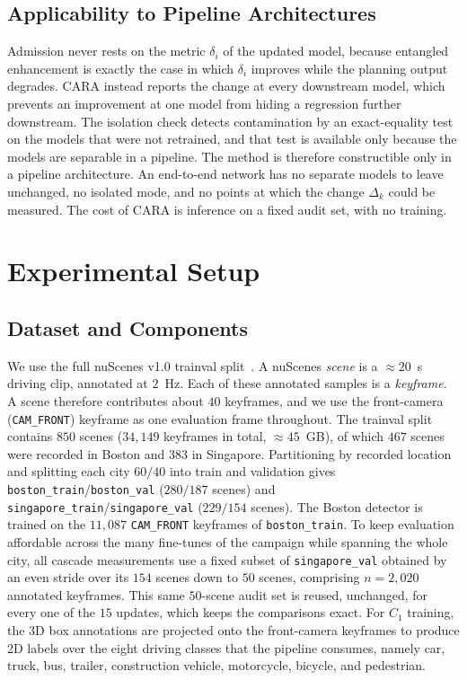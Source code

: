 \documentclass[conference]{IEEEtran}
\begin{document}
\subsection{Applicability to Pipeline Architectures}
Admission never rests on the metric $\delta_i$ of the updated model, because
entangled enhancement is exactly the case in which $\delta_i$ improves while the
planning output degrades. CARA instead reports the change at every downstream
model, which prevents an
improvement at one model from hiding a regression further downstream. The
isolation check detects contamination by an exact-equality test on the models that
were not retrained, and that test is available only because the models are
separable in a pipeline. The method is therefore constructible only in a pipeline
architecture. An end-to-end network has no separate models to leave unchanged, no
isolated mode, and no points at
which the change $\Delta_k$ could be measured. The cost of CARA is
inference on a fixed audit set, with no training.

\section{Experimental Setup}
\label{sec:setup}

\subsection{Dataset and Components}
We use the full nuScenes v1.0 trainval split~\cite{caesar2020nuscenes}. A
nuScenes \emph{scene} is a $\approx 20$~s driving clip, annotated at $2$~Hz. Each
of these annotated samples is a \emph{keyframe}. A scene therefore contributes
about $40$ keyframes, and we use the front-camera (\texttt{CAM\_FRONT}) keyframe
as one evaluation frame throughout. The trainval split contains $850$ scenes
($34{,}149$ keyframes in total, $\approx 45$~GB), of which $467$ scenes were
recorded in Boston and $383$ in Singapore. Partitioning by recorded location and
splitting each city $60/40$ into train and validation gives
\texttt{boston\_train}/\texttt{boston\_val} ($280/187$ scenes) and
\texttt{singapore\_train}/\texttt{singapore\_val} ($229/154$ scenes). The Boston
detector is trained on the $11{,}087$ \texttt{CAM\_FRONT} keyframes of
\texttt{boston\_train}. To keep evaluation affordable across the many fine-tunes
of the campaign while spanning the whole city, all cascade measurements use a
fixed subset of \texttt{singapore\_val} obtained by an even stride over its $154$
scenes down to $50$ scenes, comprising $n=2{,}020$ annotated keyframes. This same
$50$-scene audit set is reused, unchanged, for every one of the $15$ updates, which
keeps the comparisons exact. For $C_1$ training, the 3D box annotations are
projected onto the front-camera keyframes to produce 2D labels over the eight
driving classes that the pipeline consumes, namely car, truck, bus, trailer,
construction vehicle, motorcycle, bicycle, and pedestrian.
\end{document}
